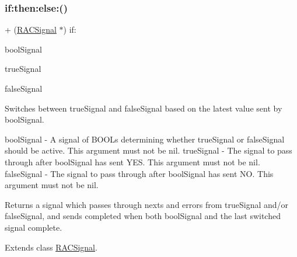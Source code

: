 \subsubsection{\texorpdfstring{if\+:then\+:else\+:()}{if:then:else:()}\hspace{0.1cm}{\footnotesize\ttfamily [1/3]}}
{\footnotesize\ttfamily + (\mbox{\hyperlink{interface_r_a_c_signal}{R\+A\+C\+Signal}} $\ast$) if\+: \begin{DoxyParamCaption}\item[{(\mbox{\hyperlink{interface_r_a_c_signal}{R\+A\+C\+Signal}} $\ast$)}]{bool\+Signal }\item[{then:(\mbox{\hyperlink{interface_r_a_c_signal}{R\+A\+C\+Signal}} $\ast$)}]{true\+Signal }\item[{else:(\mbox{\hyperlink{interface_r_a_c_signal}{R\+A\+C\+Signal}} $\ast$)}]{false\+Signal }\end{DoxyParamCaption}}

Switches between {\ttfamily true\+Signal} and {\ttfamily false\+Signal} based on the latest value sent by {\ttfamily bool\+Signal}.

bool\+Signal -\/ A signal of B\+O\+O\+Ls determining whether {\ttfamily true\+Signal} or {\ttfamily false\+Signal} should be active. This argument must not be nil. true\+Signal -\/ The signal to pass through after {\ttfamily bool\+Signal} has sent Y\+ES. This argument must not be nil. false\+Signal -\/ The signal to pass through after {\ttfamily bool\+Signal} has sent NO. This argument must not be nil.

Returns a signal which passes through {\ttfamily next}s and {\ttfamily error}s from {\ttfamily true\+Signal} and/or {\ttfamily false\+Signal}, and sends {\ttfamily completed} when both {\ttfamily bool\+Signal} and the last switched signal complete. 

Extends class \mbox{\hyperlink{interface_r_a_c_signal_a67c14dfcf505999bc53632e336f6cb84}{R\+A\+C\+Signal}}.

\mbox{\label{category_r_a_c_signal_07_operations_08_a67c14dfcf505999bc53632e336f6cb84}} 
